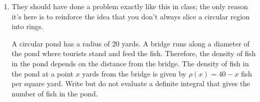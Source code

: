 \documentclass{article}
\begin{document}
\begin{enumerate}
\begin {enumerate}
    \begin{solution}
      $\displaystyle \int_0^3 \rho(x) \cdot 2 \pi (x + 3)\,dx$. 
    \end{solution}

  \end{enumerate}
  \pspace{\vfill}
\pspace{\newpage}
\item 

  \begin{workshop}
    They should have done a problem exactly like this in class; the only
    reason it's here is to reinforce the idea that you don't always slice
    a circular region into rings.
  \end{workshop}

  \begin{problem}
    A circular pond has a radius of 20 yards.  A bridge runs
    along a diameter of the pond where tourists stand and feed the fish.  Therefore, the density of fish in
    the pond depends on the distance from the bridge.  The
    density of fish in the pond at a point $x$ yards from the bridge is
    given by $\rho(x) = 40 - x$ fish per square yard.  Write but do not evaluate a definite integral that gives the number of
    fish in the pond.
  \end{problem}
  

\begin{solution}
       

\end{solution}
\end{enumerate}
\end{document}
